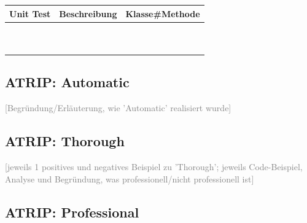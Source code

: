 \documentclass[a4paper,12pt]{article}
\newcommand{\placeholder}[1]{\textcolor{gray}{[#1]}}
\begin{document}
\bigskip
\begin{tabularx}{\textwidth}{|l|X|l|}
    \hline
    \textbf{Unit Test} & \textbf{Beschreibung} & \textbf{Klasse\#Methode} \\
    \hline
                       &                       &                          \\[1.2em]
    \hline
                       &                       &                          \\[1.2em]
    \hline
                       &                       &                          \\[1.2em]
    \hline
                       &                       &                          \\[1.2em]
    \hline
                       &                       &                          \\[1.2em]
    \hline
                       &                       &                          \\[1.2em]
    \hline
                       &                       &                          \\[1.2em]
    \hline
                       &                       &                          \\[1.2em]
    \hline
                       &                       &                          \\[1.2em]
    \hline
                       &                       &                          \\[1.2em]
    \hline
\end{tabularx}

\bigskip

\subsection*{ATRIP: Automatic}

\placeholder{Begründung/Erläuterung, wie 'Automatic' realisiert wurde}

\subsection*{ATRIP: Thorough}

\placeholder{jeweils 1 positives und negatives Beispiel zu 'Thorough'; jeweils Code-Beispiel,
    Analyse und Begründung, was professionell/nicht professionell ist}

\subsection*{ATRIP: Professional}
\end{document}
